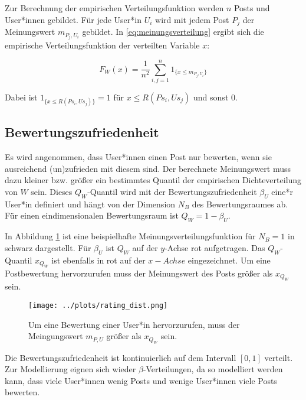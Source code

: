 Zur Berechnung der empirischen Verteilungsfunktion werden $n$ Posts und User*innen gebildet. Für jede User*in $U_i$ wird mit jedem Post $P_j$ der Meinungswert $m_{P_j, U_i}$ gebildet. In \ref{eq:meinungsverteilung} ergibt sich die empirische Verteilungsfunktion der verteilten Variable $x$:

\begin{equation}
\label{eq:meinungsverteilung}
F_W(x) = \frac{1}{n^2}\sum_{i,j = 1}^{n} 1_{\{x \leq m_{P_j, U_i}\}}
\end{equation}

Dabei ist  $1_{\{x \leq R(Ps_i,Us_j)\}} = 1$ für $x \leq R(Ps_i,Us_j)$ und sonst $0$.


\subsection{Bewertungszufriedenheit}
\label{bewertungszufriedenheit}
Es wird angenommen, dass User*innen einen Post nur bewerten, wenn sie ausreichend (un)zufrieden mit diesem sind. Der berechnete Meinungswert muss dazu kleiner bzw. größer ein bestimmtes Quantil der empirischen Dichteverteilung von $W$ sein. Dieses $Q_W$-Quantil wird mit der Bewertungszufriedenheit $\beta_U$ eine*r User*in definiert und hängt von der Dimension $N_B$ des Bewertungsraumes ab. Für einen eindimensionalen Bewertungsraum ist $Q_W = 1 - \beta_U$. 

In Abbildung \ref{fig:bewzuf} ist eine beispielhafte Meinungsverteilungsfunktion für $N_B = 1$ in schwarz dargestellt. Für $\beta_U$ ist $Q_W$ auf der $y$-Achse rot aufgetragen. Das $Q_W$-Quantil $x_{Q_W}$ ist ebenfalls in rot auf der $x-Achse$ eingezeichnet. Um eine Postbewertung hervorzurufen muss der Meinungswert des Posts größer als $x_{Q_W}$ sein.

\begin{figure}
	\centering
	\label{fig:bewzuf}
	\texttt{[image: ../plots/rating\_dist.png]}
	\caption{Um eine Bewertung einer User*in hervorzurufen, muss der Meingungswert $m_{P,U}$ größer als $x_{Q_W}$ sein.}
\end{figure}


Die Bewertungszufriedenheit ist kontinuierlich auf dem Intervall $[0,1]$ verteilt. Zur Modellierung eignen sich wieder $\beta$-Verteilungen, da so modelliert werden kann, dass viele User*innen wenig Posts und wenige User*innen viele Posts bewerten.



